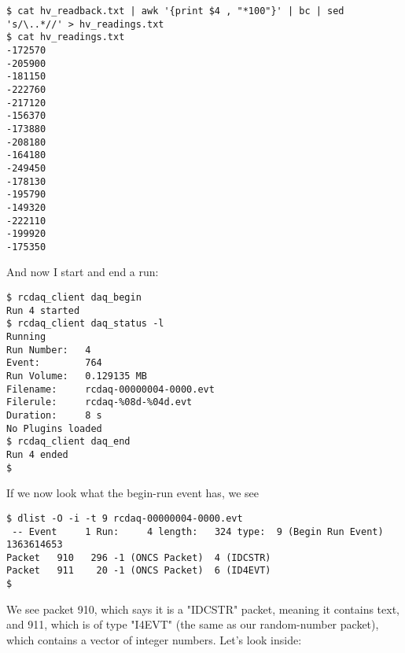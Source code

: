 \documentclass{article}[11pt]
\begin{document}
\begin{verbatim}
$ cat hv_readback.txt | awk '{print $4 , "*100"}' | bc | sed 's/\..*//' > hv_readings.txt
$ cat hv_readings.txt
-172570
-205900
-181150
-222760
-217120
-156370
-173880
-208180
-164180
-249450
-178130
-195790
-149320
-222110
-199920
-175350
\end{verbatim}

And now I start and end a run:

\begin{verbatim}
$ rcdaq_client daq_begin
Run 4 started
$ rcdaq_client daq_status -l
Running
Run Number:   4
Event:        764
Run Volume:   0.129135 MB
Filename:     rcdaq-00000004-0000.evt
Filerule:     rcdaq-%08d-%04d.evt
Duration:     8 s
No Plugins loaded
$ rcdaq_client daq_end
Run 4 ended
$ 
\end{verbatim}

If we now look what the begin-run event has, we see

\begin{verbatim}
$ dlist -O -i -t 9 rcdaq-00000004-0000.evt
 -- Event     1 Run:     4 length:   324 type:  9 (Begin Run Event)  1363614653
Packet   910   296 -1 (ONCS Packet)  4 (IDCSTR)
Packet   911    20 -1 (ONCS Packet)  6 (ID4EVT)
$
\end{verbatim}

We see packet 910, which says it is a "IDCSTR" packet, meaning it
contains text, and 911, which is of type "I4EVT" (the same as our
random-number packet), which contains a vector of integer
numbers. Let's look inside:
\end{document}
